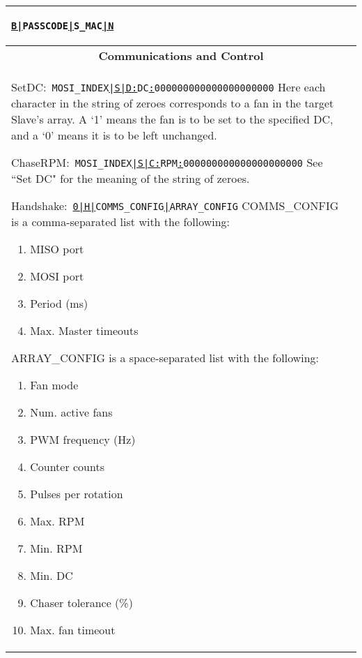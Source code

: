 \documentclass{article}
\begin{document}
\begin{center}
\begin{longtable}{| p{} | p{} |}
\begin{itemize}
		\linebreak\texttt{\underline{B|}PASSCODE\underline{|}S\_MAC\underline{|N}}
	\end{itemize}
	\\
	\hline
	\multicolumn{2}{|c|}{\textbf{Communications and Control}}\\*
	\hline
	\begin{itemize}
	{\scriptsize
		\item {Set\hspace{.5em}DC:}\
		\linebreak\texttt{MOSI\_INDEX\underline{|S|D:}DC\underline{:}000000000000000000000}
		\linebreak Here each character in the string of zeroes corresponds to a fan in the
		target Slave's array. A `1' means the fan is to be set to the specified DC, and 
		a `0' means it is to be left unchanged.
		\item {Chase\hspace{.5em}RPM:}\
		\linebreak\texttt{MOSI\_INDEX\underline{|S|C:}RPM\underline{:}000000000000000000000}
		\linebreak See ``Set DC" for the meaning of the string of zeroes.
		\item {Handshake:}\
		\linebreak\texttt{\underline{0|H|}COMMS\_CONFIG\underline{|}ARRAY\_CONFIG}
		\linebreak COMMS\_CONFIG is a comma-separated list with the following:
		\begin{enumerate}
			\item MISO port
			\item MOSI port
			\item Period (ms)
			\item Max. Master timeouts
		\end{enumerate}
		ARRAY\_CONFIG is a space-separated list with the following:
		\begin{enumerate}
			\item Fan mode
			\item Num. active fans
			\item PWM frequency (Hz)
			\item Counter counts
			\item Pulses per rotation 
			\item Max. RPM
			\item Min. RPM
			\item Min. DC
			\item Chaser tolerance (\%)
			\item Max. fan timeout

\end{enumerate}}
\end{itemize}
\end{longtable}
\end{center}
\end{document}
